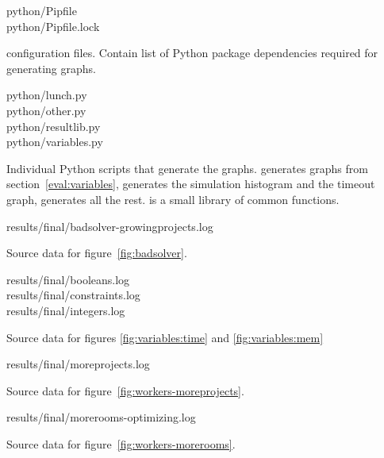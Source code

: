 \begin{filepath}
python/Pipfile\\
python/Pipfile.lock
\end{filepath}
\begin{dsldesc}
     configuration files. Contain list of Python package dependencies
    required for generating graphs.
\end{dsldesc}

\begin{filepath}
python/lunch.py\\
python/other.py\\
python/resultlib.py\\
python/variables.py
\end{filepath}
\begin{dsldesc}
    Individual Python scripts that generate the graphs.  generates
    graphs from section~\ref{eval:variables},  generates the simulation
    histogram and the timeout graph,  generates all the rest.
     is a small library of common functions.
\end{dsldesc}

\begin{filepath}
results/final/badsolver-growingprojects.log
\end{filepath}
\begin{dsldesc}
    Source data for figure~\ref{fig:badsolver}.
\end{dsldesc}

\pagebreak
\begin{filepath}
results/final/booleans.log\\
results/final/constraints.log\\
results/final/integers.log
\end{filepath}
\begin{dsldesc}
    Source data for figures \ref{fig:variables:time} and \ref{fig:variables:mem}
\end{dsldesc}

\begin{filepath}
results/final/moreprojects.log
\end{filepath}
\begin{dsldesc}
    Source data for figure~\ref{fig:workers-moreprojects}.
\end{dsldesc}

\begin{filepath}
results/final/morerooms-optimizing.log
\end{filepath}
\begin{dsldesc}
    Source data for figure~\ref{fig:workers-morerooms}.
\end{dsldesc}

